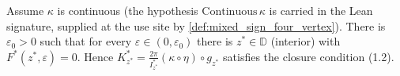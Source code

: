 \begin{theorem}

  \label{thm:exists_closing_param}
  Assume $\kappa$ is continuous (the hypothesis $\mathrm{Continuous}\,\kappa$ is
  carried in the Lean signature, supplied at the use site by
  \cref{def:mixed_sign_four_vertex}). There is $\varepsilon_0>0$ such that for every
  $\varepsilon\in(0,\varepsilon_0)$ there is $z^*\in\mathbb{D}$ (interior) with
  $F^*(z^*,\varepsilon)=0$. Hence
  $K^*_{z^*}=\tfrac{2\pi}{I^*_{z^*}}(\kappa\circ\eta)\circ g_{z^*}$ satisfies the
  closure condition (1.2).
\end{theorem}

